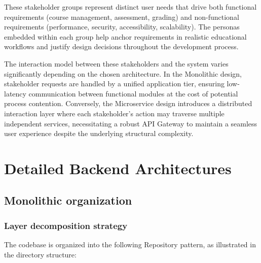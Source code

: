 These stakeholder groups represent distinct user needs that drive both functional 
requirements (course management, assessment, grading) and non-functional requirements 
(performance, security, accessibility, scalability). The personas embedded within each 
group help anchor requirements in realistic educational workflows and justify design 
decisions throughout the development process.

The interaction model between these stakeholders and the system varies significantly depending on the chosen architecture. In the Monolithic design, stakeholder requests are handled by a unified application tier, ensuring low-latency communication between functional modules at the cost of potential process contention. Conversely, the Microservice design introduces a distributed interaction layer where each stakeholder's action may traverse multiple independent services, necessitating a robust API Gateway to maintain a seamless user experience despite the underlying structural complexity.

\section{Detailed Backend Architectures}

\subsection{Monolithic organization}

\subsubsection{Layer decomposition strategy}


The codebase is organized into the following Repository pattern, as illustrated in the directory 
structure:

